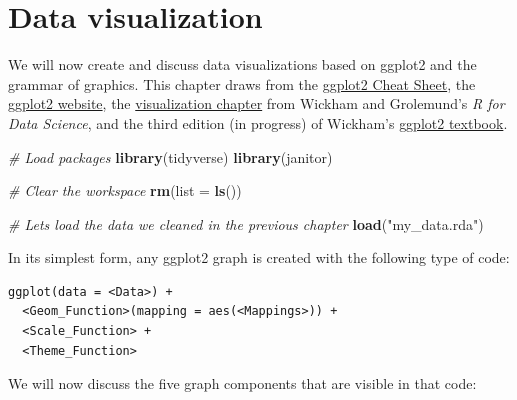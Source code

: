 \documentclass[
]{book}
\newenvironment{Shaded}{\begin{snugshade}}{\end{snugshade}}
\newcommand{\AttributeTok}[1]{\textcolor[rgb]{0.13,0.29,0.53}{#1}}
\newcommand{\CommentTok}[1]{\textcolor[rgb]{0.56,0.35,0.01}{\textit{#1}}}
\newcommand{\FunctionTok}[1]{\textcolor[rgb]{0.13,0.29,0.53}{\textbf{#1}}}
\newcommand{\NormalTok}[1]{#1}
\newcommand{\StringTok}[1]{\textcolor[rgb]{0.31,0.60,0.02}{#1}}
\begin{document}
\hypertarget{visualization}{%
\chapter{Data visualization}\label{visualization}}

We will now create and discuss data visualizations based on ggplot2 and the grammar of graphics. This chapter draws from the \href{https://rstudio.github.io/cheatsheets/html/data-visualization.html?_gl=1*10368jz*_ga*MjQ1OTc2NzA0LjE3MTIxMzM1NTU.*_ga_2C0WZ1JHG0*MTcxMzUyMzU4My40LjEuMTcxMzUyMzYxNS4wLjAuMA..}{ggplot2 Cheat Sheet}, the \href{https://ggplot2.tidyverse.org/}{ggplot2 website}, the \href{https://r4ds.hadley.nz/data-visualize.html}{visualization chapter} from Wickham and Grolemund's \emph{R for Data Science}, and the third edition (in progress) of Wickham's \href{https://ggplot2-book.org/}{ggplot2 textbook}.

\begin{Shaded}
\begin{Highlighting}[]
\CommentTok{\# Load packages}
\FunctionTok{library}\NormalTok{(tidyverse)}
\FunctionTok{library}\NormalTok{(janitor)}

\CommentTok{\# Clear the workspace}
\FunctionTok{rm}\NormalTok{(}\AttributeTok{list =} \FunctionTok{ls}\NormalTok{())}

\CommentTok{\# Let\textquotesingle{}s load the data we cleaned in the previous chapter}
\FunctionTok{load}\NormalTok{(}\StringTok{"my\_data.rda"}\NormalTok{)}
\end{Highlighting}
\end{Shaded}

In its simplest form, any ggplot2 graph is created with the following type of code:

\begin{verbatim}
ggplot(data = <Data>) +
  <Geom_Function>(mapping = aes(<Mappings>)) +
  <Scale_Function> +
  <Theme_Function>
\end{verbatim}

We will now discuss the five graph components that are visible in that code:
\end{document}
